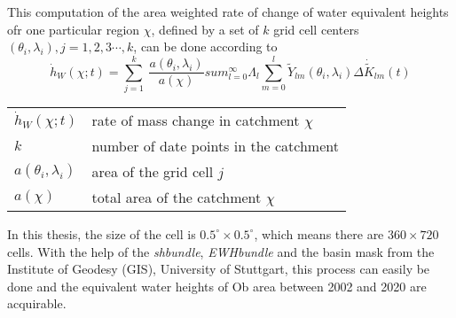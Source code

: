 This computation of the area weighted rate of change of water equivalent heights ofr one particular region $\chi$, defined by a set of $k$ grid cell centers $(\theta_{i}, \lambda_{i}),j=1,2,3\cdots,k$, can be done according to
\begin{equation}
\dot{h}_{W}(\chi;t) = \sum_{j=1}^{k}\ \frac{a(\theta_{i},\lambda_{i})}{a(\chi)} sum_{l=0}^{\infty} \Lambda_{l} \sum_{m=0}^{l} \tilde{Y}_{lm}(\theta_{i},\lambda_{i}) \Delta \dot{\tilde{K}}_{lm}(t)
\end{equation}
\begin{table}[htbp]
	\begin{tabular}{ll}
		$\dot{h}_{W}(\chi;t)$	&  rate of mass change in catchment $\chi$\\ 
		$k$	&  number of date points in the catchment\\ 
		$a(\theta_{i},\lambda_{i})$	&  area of the grid cell $j$\\ 
		$a(\chi)$	&  total area of the catchment $\chi$\\ 
	\end{tabular}
\end{table}
In this thesis, the size of the cell is $0.5^{\circ} \times 0.5^{\circ}$, which means there are $360 \times 720$ cells.
With the help of the \textit{shbundle}, \textit{EWHbundle} and the basin mask from the Institute of Geodesy (GIS), University of Stuttgart, this process can easily be done and the equivalent water heights of Ob area between 2002 and 2020 are acquirable. 